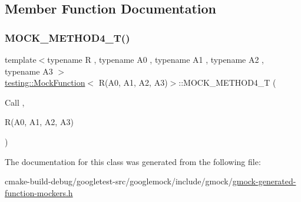 \subsection{Member Function Documentation}
\mbox{\label{classtesting_1_1MockFunction_3_01R_07A0_00_01A1_00_01A2_00_01A3_08_4_ad158c25a1b33cb53bae3f0eb9df0d59c}} 
\subsubsection{\texorpdfstring{MOCK\_METHOD4\_T()}{MOCK\_METHOD4\_T()}}
{\footnotesize\ttfamily template$<$typename R , typename A0 , typename A1 , typename A2 , typename A3 $>$ \\
\mbox{\hyperlink{classtesting_1_1MockFunction}{testing\+::\+Mock\+Function}}$<$ R(A0, A1, A2, A3)$>$\+::M\+O\+C\+K\+\_\+\+M\+E\+T\+H\+O\+D4\+\_\+T (\begin{DoxyParamCaption}\item[{Call}]{,  }\item[{R(A0, A1, A2, A3)}]{ }\end{DoxyParamCaption})}



The documentation for this class was generated from the following file\+:\begin{DoxyCompactItemize}
\item 
cmake-\/build-\/debug/googletest-\/src/googlemock/include/gmock/\mbox{\hyperlink{gmock-generated-function-mockers_8h}{gmock-\/generated-\/function-\/mockers.\+h}}\end{DoxyCompactItemize}
